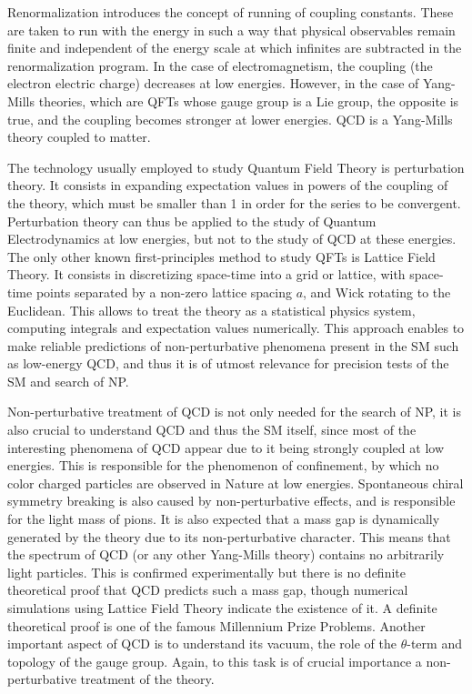 Renormalization introduces the concept of running of coupling constants. These are taken to run with the energy in such a way that physical observables remain finite and independent of the energy scale at which infinites are subtracted in the renormalization program.  In the case of electromagnetism, the coupling (the electron electric charge) decreases at low energies. However, in the case of Yang-Mills theories, which are QFTs whose gauge group is a Lie group, the opposite is true, and the coupling becomes stronger at lower energies. QCD is a Yang-Mills theory coupled to matter.

The technology usually employed to study Quantum Field Theory is perturbation theory. It consists in expanding expectation values in powers of the coupling of the theory, which must be smaller than 1 in order for the series to be convergent. Perturbation theory can thus be applied to the study of Quantum Electrodynamics at low energies, but not to the study of QCD at these energies. The only other known first-principles method to study QFTs is Lattice Field Theory. It consists in discretizing space-time into a grid or lattice, with space-time points separated by a non-zero lattice spacing $a$, and Wick rotating to the Euclidean. This allows to treat the theory as a statistical physics system, computing integrals and expectation values numerically. This approach enables to make reliable predictions of non-perturbative phenomena present in the SM such as low-energy QCD, and thus it is of utmost relevance for precision tests of the SM and search of NP. 

Non-perturbative treatment of QCD is not only needed for the search of NP, it is also crucial to understand QCD and thus the SM itself, since most of the interesting phenomena of QCD appear due to it being strongly coupled at low energies. This is responsible for the phenomenon of confinement, by which no color charged particles are observed in Nature at low energies. Spontaneous chiral symmetry breaking is also caused by non-perturbative effects, and is responsible for the light mass of pions. It is also expected that a mass gap is dynamically generated by the theory due to its non-perturbative character. This means that the spectrum of QCD (or any other Yang-Mills theory) contains no arbitrarily light particles. This is confirmed experimentally but there is no definite theoretical proof that QCD predicts such a mass gap, though numerical simulations using Lattice Field Theory indicate the existence of it. A definite theoretical proof is one of the famous Millennium Prize Problems. Another important aspect of QCD is to understand its vacuum, the role of the $\theta$-term and topology of the gauge group. Again, to this task is of crucial importance a non-perturbative treatment of the theory.

